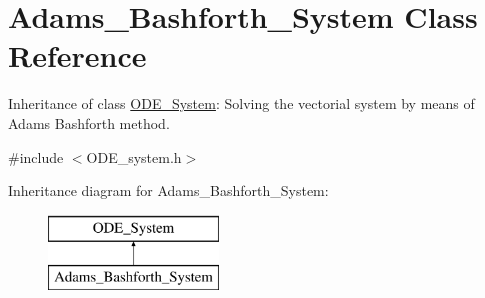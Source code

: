 \hypertarget{class_adams___bashforth___system}{}\section{Adams\+\_\+\+Bashforth\+\_\+\+System Class Reference}
\label{class_adams___bashforth___system}


Inheritance of class \mbox{\hyperlink{class_o_d_e___system}{O\+D\+E\+\_\+\+System}}\+: Solving the vectorial system by means of Adams Bashforth method.  




{\ttfamily \#include $<$O\+D\+E\+\_\+system.\+h$>$}

Inheritance diagram for Adams\+\_\+\+Bashforth\+\_\+\+System\+:\begin{figure}[H]
\begin{center}
\leavevmode
\includegraphics[height=2.000000cm]{class_adams___bashforth___system}
\end{center}
\end{figure}
